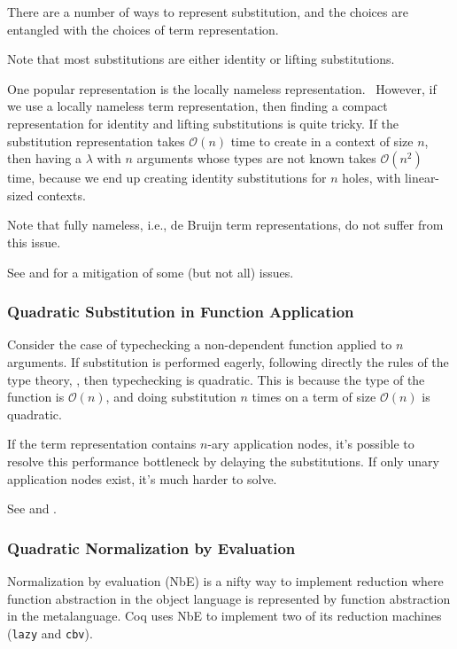 There are a number of ways to represent substitution, and the choices are entangled with the choices of term representation.

Note that most substitutions are either identity or lifting substitutions.

One popular representation is the locally nameless representation.~\cite{locally-nameless}
However, if we use a locally nameless term representation, then finding a compact representation for identity and lifting substitutions is quite tricky.
If the substitution representation takes $\mathcal O(n)$ time to create in a context of size $n$, then having a $\lambda$ with $n$ arguments whose types are not known takes $\mathcal O(n^2)$ time, because we end up creating identity substitutions for $n$ holes, with linear-sized contexts.

Note that fully nameless, i.e., de Bruijn term representations, do not suffer from this issue.

See  and  for a mitigation of some (but not all) issues.


\subsubsection{Quadratic Substitution in Function Application} \label{sec:perf:quadratic-application}
Consider the case of typechecking a non-dependent function applied to $n$ arguments.
If substitution is performed eagerly, following directly the rules of the type theory, , then typechecking is quadratic.
This is because the type of the function is $\mathcal{O}(n)$, and doing substitution $n$ times on a term of size $\mathcal{O}(n)$ is quadratic.

If the term representation contains $n$-ary application nodes, it's possible to resolve this performance bottleneck by delaying the substitutions.
If only unary application nodes exist, it's much harder to solve.

See  and .


\subsubsection{Quadratic Normalization by Evaluation} \label{sec:perf:quadratic-NbE} \label{sec:perf:quadratic-cbv}
Normalization by evaluation (NbE) is a nifty way to implement reduction where function abstraction in the object language is represented by function abstraction in the metalanguage.
Coq uses NbE to implement two of its reduction machines (\texttt{lazy} and \texttt{cbv}).

